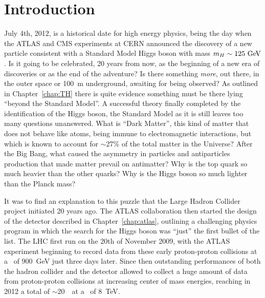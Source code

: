 \clearpage{\pagestyle{empty}\cleardoublepage}

\chapter*{Introduction}\label{chap:intro}

\vskip-2.5cm

July 4th, 2012, is a historical date for high energy physics,
being the day when the ATLAS and CMS experiments at CERN announced
the discovery of a new particle consistent with a Standard Model Higgs
boson with mass $m_H\sim 125\gev$. Is it going to be celebrated, 20 years
from now, as the beginning of a new era of discoveries or as the 
end of the adventure? Is there something {\it more}, out there, in 
the outer space or 100~m underground, awaiting for being observed?
As outlined in Chapter~\ref{chap:TH} there is quite evidence
something must be there lying ``beyond the Standard Model''. 
A successful theory finally completed
by the identification of the Higgs boson, 
the Standard Model as it is still leaves too many questions
unanswered. What is ``Dark Matter'', this kind of matter that does not
behave like atoms, being immune to electromagnetic interactions, but which
is known to account for $\sim$27\% of the total matter in the Universe?
After the Big Bang, what caused the asymmetry in particles and
antiparticles production that made matter prevail on antimatter?
Why is the top quark so much heavier than the other quarks? Why is the
Higgs boson so much lighter than the Planck mass?

It was to find an explanation to this puzzle that the 
Large Hadron Collider project initiated 20 years ago. The ATLAS
collaboration then started the design of the detector described in
Chapter~\ref{chap:atlas}, outlining a challenging physics program
in which the search for the Higgs boson was ``just'' the first bullet
of the list.
The LHC first run on the 20th of November 2009, with the ATLAS
experiment beginning to record data from these early proton-proton
collisions at a \cme\ of $900$~GeV just three days later.
Since then outstanding performances of both the hadron collider
and the detector allowed to collect a huge amount of data
from proton-proton collisions at increasing center of mass energies, reaching in
2012 a total of $\sim$20~\ifb\ at a \cme\ of 8~TeV.

